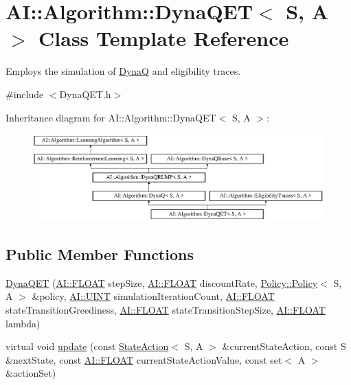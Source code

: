 \hypertarget{classAI_1_1Algorithm_1_1DynaQET}{\section{A\-I\-:\-:Algorithm\-:\-:Dyna\-Q\-E\-T$<$ S, A $>$ Class Template Reference}
\label{classAI_1_1Algorithm_1_1DynaQET}
}


Employs the simulation of \hyperlink{classAI_1_1Algorithm_1_1DynaQ}{Dyna\-Q} and eligibility traces.  




{\ttfamily \#include $<$Dyna\-Q\-E\-T.\-h$>$}

Inheritance diagram for A\-I\-:\-:Algorithm\-:\-:Dyna\-Q\-E\-T$<$ S, A $>$\-:\begin{figure}[H]
\begin{center}
\leavevmode
\includegraphics[height=3.357314cm]{classAI_1_1Algorithm_1_1DynaQET}
\end{center}
\end{figure}
\subsection*{Public Member Functions}
\begin{DoxyCompactItemize}
\item 
\hyperlink{classAI_1_1Algorithm_1_1DynaQET_a019b0f19851056777310084939f0b3a1}{Dyna\-Q\-E\-T} (\hyperlink{namespaceAI_a41b74884a20833db653dded3918e05c3}{A\-I\-::\-F\-L\-O\-A\-T} step\-Size, \hyperlink{namespaceAI_a41b74884a20833db653dded3918e05c3}{A\-I\-::\-F\-L\-O\-A\-T} discount\-Rate, \hyperlink{classAI_1_1Algorithm_1_1Policy_1_1Policy}{Policy\-::\-Policy}$<$ S, A $>$ \&policy, \hyperlink{namespaceAI_ab6e14dc1e659854858a87e511f1439ec}{A\-I\-::\-U\-I\-N\-T} simulation\-Iteration\-Count, \hyperlink{namespaceAI_a41b74884a20833db653dded3918e05c3}{A\-I\-::\-F\-L\-O\-A\-T} state\-Transition\-Greediness, \hyperlink{namespaceAI_a41b74884a20833db653dded3918e05c3}{A\-I\-::\-F\-L\-O\-A\-T} state\-Transition\-Step\-Size, \hyperlink{namespaceAI_a41b74884a20833db653dded3918e05c3}{A\-I\-::\-F\-L\-O\-A\-T} lambda)
\item 
virtual void \hyperlink{classAI_1_1Algorithm_1_1DynaQET_a53b0e06842fbb802acfa5384a84ad448}{update} (const \hyperlink{classAI_1_1StateAction}{State\-Action}$<$ S, A $>$ \&current\-State\-Action, const S \&next\-State, const \hyperlink{namespaceAI_a41b74884a20833db653dded3918e05c3}{A\-I\-::\-F\-L\-O\-A\-T} current\-State\-Action\-Value, const set$<$ A $>$ \&action\-Set)
\end{DoxyCompactItemize}
